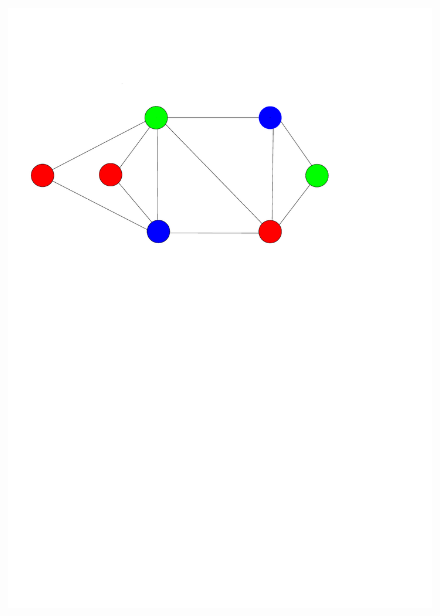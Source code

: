 \documentclass[12pt,a4paper,twoside]{scrartcl}
\numberwithin{equation}{section}
\begin{document}
\begin{figure}[h!]
  \centering
  \begin{minipage}[b]{0.49\textwidth}
    \includegraphics[width=\textwidth]{1/nodeColoring1.pdf}
  \end{minipage}
  \hfill
  \begin{minipage}[b]{0.49\textwidth}

\end{minipage}
\end{figure}
\end{document}
